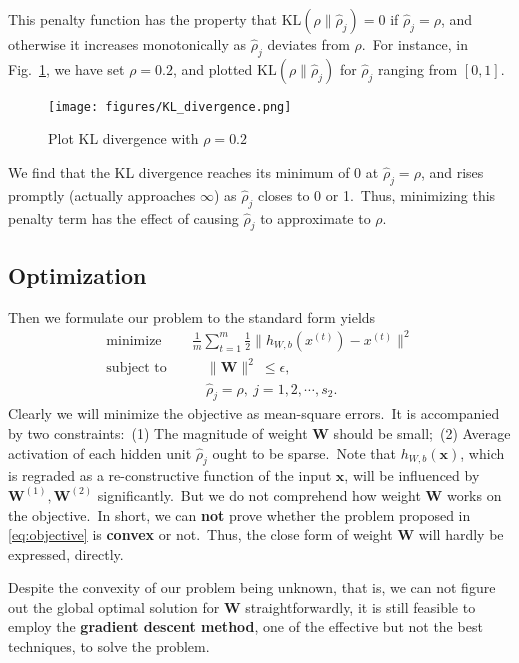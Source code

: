 This penalty function has the property that $\text{KL} (\rho \parallel \hat{\rho}_j) = 0$ if $\hat{\rho}_j = \rho$, and otherwise it increases monotonically as $\hat{\rho}_j$ deviates from $\rho$.~For instance, in Fig.~\ref{fig:KL}, we have set $\rho = 0.2$, and plotted $\text{KL} (\rho \parallel \hat{\rho}_j)$ for $\hat{\rho}_j$ ranging from $[0,1]$.
\begin{figure}[htbp]
	\centering
	\texttt{[image: figures/KL\_divergence.png]}
	\caption{Plot KL divergence with $\rho = 0.2$} \label{fig:KL}
\end{figure}

We find that the KL divergence reaches its minimum of 0 at $\hat{\rho}_j = \rho$, and rises promptly (actually approaches $\infty$) as $\hat{\rho}_j$ closes to 0 or 1.~Thus, minimizing this penalty term has the effect of causing $\hat{\rho}_j$ to approximate to $\rho$.

\subsection{Optimization}
Then we formulate our problem to the standard form yields
\begin{align}
	\text{minimize} \quad & \frac{1}{m} \sum_{t=1}^m \frac{1}{2} \parallel h_{W,b}(x^{(t)})- x^{(t)} \parallel ^2 \label{eq:objective} \\
	\text{subject to} \quad & \quad \parallel \bm{W} \parallel ^2 \ \leqslant \epsilon, \label{eq:weight_decay} \\
	& \quad \hat{\rho}_j = \rho,~j=1,2,\cdots,s_2. 
\end{align}
Clearly we will minimize the objective as mean-square errors.~It is accompanied by two constraints:~(1) The magnitude of weight $\bm{W}$ should be small;~(2) Average activation of each hidden unit $\hat{\rho}_j$ ought to be sparse.~Note that $h_{W,b}(\bm{x})$, which is regraded as a re-constructive function of the input $\bm{x}$, will be influenced by $\bm{W}^{(1)},\bm{W}^{(2)}$ significantly.~But we do not comprehend how weight $\bm{W}$ works on the objective.~In short, we can \textbf{not} prove whether the problem proposed in \eqref{eq:objective} is \textbf{convex} or not.~Thus, the close form of weight $\bm{W}$ will hardly be expressed, directly.

Despite the convexity of our problem being unknown, that is, we can not figure out the global optimal solution for $\bm{W}$ straightforwardly, it is still feasible to employ the \textbf{gradient descent method}, one of the effective but not the best techniques, to solve the problem.

